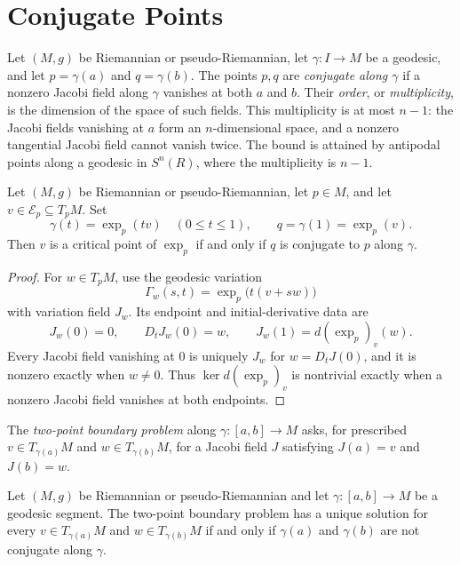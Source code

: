 \section{Conjugate Points}

Let $(M,g)$ be Riemannian or pseudo-Riemannian, let $\gamma:I\to M$ be a
geodesic, and let $p=\gamma(a)$ and $q=\gamma(b)$. The points $p,q$ are
\emph{conjugate along $\gamma$} if a nonzero Jacobi field along $\gamma$
vanishes at both $a$ and $b$. Their \emph{order}, or \emph{multiplicity}, is
the dimension of the space of such fields. This multiplicity is at most
$n-1$: the Jacobi fields vanishing at $a$ form an $n$-dimensional space, and
a nonzero tangential Jacobi field cannot vanish twice. The bound is attained
by antipodal points along a geodesic in $S^n(R)$, where the multiplicity is
$n-1$.

\begin{proposition}
\label{prop:critical-points-conjugate}
\leanok

Let $(M,g)$ be Riemannian or pseudo-Riemannian, let $p\in M$, and let
$v\in\mathcal E_p\subseteq T_pM$. Set
\[
\gamma(t)=\exp_p(tv)\quad(0\leq t\leq1),
\qquad
q=\gamma(1)=\exp_p(v).
\]
Then $v$ is a critical point of $\exp_p$ if and only if $q$ is conjugate to
$p$ along $\gamma$.

\begin{proof}
\sketch For $w\in T_pM$, use the geodesic variation
\[
\Gamma_w(s,t)=\exp_p\bigl(t(v+sw)\bigr)
\]
with variation field $J_w$. Its endpoint and initial-derivative data are
\[
J_w(0)=0,\qquad D_tJ_w(0)=w,\qquad
J_w(1)=d(\exp_p)_v(w).
\]
Every Jacobi field vanishing at $0$ is uniquely $J_w$ for
$w=D_tJ(0)$, and it is nonzero exactly when $w\neq0$. Thus
$\ker d(\exp_p)_v$ is nontrivial exactly when a nonzero Jacobi field vanishes
at both endpoints.
\end{proof}
\end{proposition}

The \emph{two-point boundary problem} along
$\gamma:[a,b]\to M$ asks, for prescribed
$v\in T_{\gamma(a)}M$ and $w\in T_{\gamma(b)}M$, for a Jacobi field $J$
satisfying $J(a)=v$ and $J(b)=w$.

\begin{proposition}
\label{prop:two-point-boundary-problem}

Let $(M,g)$ be Riemannian or pseudo-Riemannian and let
$\gamma:[a,b]\to M$ be a geodesic segment. The two-point boundary problem
has a unique solution for every
$v\in T_{\gamma(a)}M$ and $w\in T_{\gamma(b)}M$ if and only if
$\gamma(a)$ and $\gamma(b)$ are not conjugate along $\gamma$.
\end{proposition}

